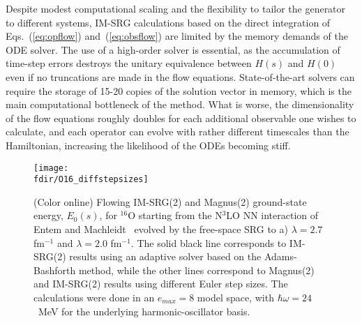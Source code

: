 Despite modest computational scaling and the flexibility to tailor the
generator to different systems, IM-SRG calculations based on the
direct integration of Eqs.~(\ref{eq:opflow}) and~(\ref{eq:obsflow}) are
limited by the memory demands of the ODE solver. The use of a
high-order solver is essential, as the accumulation of time-step
errors destroys the unitary equivalence between $H(s)$ and $H(0)$ even
if no truncations are made in the flow equations. State-of-the-art
solvers can require the storage of 15-20 copies of the solution vector
in memory, which is the main computational bottleneck of the method.
What is worse, the dimensionality of the flow equations roughly
doubles for each additional observable one wishes to calculate, and
each operator can evolve with rather different timescales than the
Hamiltonian, increasing the likelihood of the ODEs becoming
stiff.

\begin{figure}[t]
\begin{center}
\texttt{[image: \\fdir/O16\_diffstepsizes]}
\caption{\label{fig:timestep_O16}
(Color online) Flowing IM-SRG(2) and Magnus(2) ground-state energy, 
$E_0(s)$, for $^{16}$O starting from the N$^3$LO NN interaction of
Entem and Machleidt~\cite{Entem:2003th,Machleidt:2011bh} evolved by
the free-space SRG to a) $\lambda=2.7$ fm$^{-1}$ and $\lambda = 2.0$
fm$^{-1}$. The solid black line corresponds to IM-SRG(2) results using
an adaptive solver based on the Adams-Bashforth method, while the
other lines correspond to Magnus(2) and IM-SRG(2) results using
different Euler step sizes. The calculations were done in an
$e_{max}=8$ model space, with $\hbar\omega = 24$~MeV for the
underlying harmonic-oscillator basis.}
\end{center}
\end{figure}

